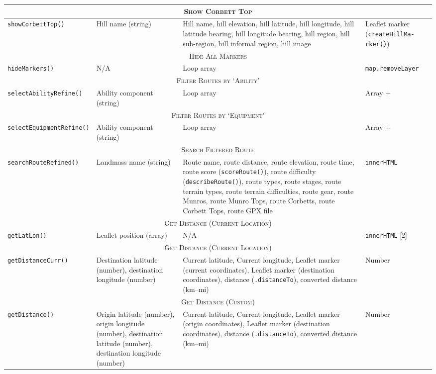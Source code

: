 \documentclass[11pt, english]{article}
\begin{document}
\begin{center}
\begin{longtable}{p{2.25cm}p{3.5cm}p{5cm}p{2cm}}
		\hline
		\multicolumn{4}{c}{\textsc{Show Corbett Top}}\\
		\hline
		\texttt{showCorbettTop()} & Hill name (string) & Hill name, hill elevation, hill latitude, hill longitude, hill latitude bearing, hill longitude bearing, hill region, hill sub-region, hill informal region, hill image & Leaflet marker (\texttt{createHillMa- rker()})\\
		\hline
		\multicolumn{4}{c}{\textsc{Hide All Markers}}\\
		\hline
		\texttt{hideMarkers()} & N/A & Loop array & \texttt{map.removeLayer}\\
		\hline
		\multicolumn{4}{c}{\textsc{Filter Routes by `Ability'}}\\
		\hline
		\texttt{selectAbilityRefine()} & Ability component (string) & Loop array & Array $+$\\
		\hline
		\multicolumn{4}{c}{\textsc{Filter Routes by `Equipment'}}\\
		\hline
		\texttt{selectEquipmentRefine()} & Ability component (string) & Loop array & Array $+$\\
		\hline
		\multicolumn{4}{c}{\textsc{Search Filtered Route}}\\
		\hline
		\texttt{searchRouteRefined()} & Landmass name (string) & Route name, route distance, route elevation, route time, route score (\texttt{scoreRoute()}), route difficulty (\texttt{describeRoute()}), route types, route stages, route terrain types, route terrain difficulties, route gear, route Munros, route Munro Tops, route Corbetts, route Corbett Tops, route GPX file & \texttt{innerHTML}\\
		\hline
		\multicolumn{4}{c}{\textsc{Get Distance (Current Location)}}\\
		\hline
		\texttt{getLatLon()} & Leaflet position (array) & N/A & \texttt{innerHTML} [2]\\
		\hline
		\multicolumn{4}{c}{\textsc{Get Distance (Current Location)}}\\
		\hline
		\texttt{getDistanceCurr()} & Destination latitude (number), destination longitude (number) & Current latitude, Current longitude, Leaflet marker (current coordinates), Leaflet marker (destination coordinates), distance (\texttt{.distanceTo}), converted distance (km--mi) & Number\\
		\hline
		\multicolumn{4}{c}{\textsc{Get Distance (Custom)}}\\
		\hline
		\texttt{getDistance()} & Origin latitude (number), origin longitude (number), destination latitude (number), destination longitude (number) & Current latitude, Current longitude, Leaflet marker (origin coordinates), Leaflet marker (destination coordinates), distance (\texttt{.distanceTo}), converted distance (km--mi) & Number\\

\end{longtable}
\end{center}
\end{document}
